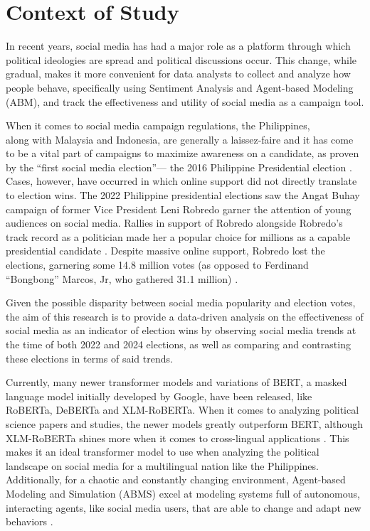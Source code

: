 \section{Context of Study}
In recent years, social media has had a major role as a platform through which political ideologies are spread and political discussions occur. This change, while gradual, makes it more convenient for data analysts to collect and analyze how people behave, specifically using Sentiment Analysis and Agent-based Modeling (ABM), and track the effectiveness and utility of social media as a campaign tool.

When it comes to social media campaign regulations, the Philippines,\\
along with Malaysia and Indonesia, are generally a laissez-faire and it has come to be a vital part of campaigns to maximize awareness on a candidate, as proven by the “first social media election”— the 2016 Philippine Presidential election \cite{Tapsell-2020, Sinpeng-2020}. Cases, however, have occurred in which online support did not directly translate to election wins. The 2022 Philippine presidential elections saw the Angat Buhay campaign of former Vice President Leni Robredo garner the attention of young audiences on social media. Rallies in support of Robredo alongside Robredo’s track record as a politician made her a popular choice for millions as a capable presidential candidate \cite{Johnson-2022}. Despite massive online support, Robredo lost the elections, garnering some 14.8 million votes (as opposed to Ferdinand “Bongbong” Marcos, Jr, who gathered 31.1 million) \cite{ABSCBN-2022}.

Given the possible disparity between social media popularity and election votes, the aim of this research is to provide a data-driven analysis on the effectiveness of social media as an indicator of election wins by observing social media trends at the time of both 2022 and 2024 elections, as well as comparing and contrasting these elections in terms of said trends.

Currently, many newer transformer models and variations of BERT, a masked language model initially developed by Google, have been released, like\\
RoBERTa, DeBERTa and XLM-RoBERTa. When it comes to analyzing political science papers and studies, the newer models greatly outperform BERT, although XLM-RoBERTa shines more when it comes to cross-lingual applications \cite{Timoneda-2025}. This makes it an ideal transformer model to use when analyzing the political landscape on social media for a multilingual nation like the Philippines. Additionally, for a chaotic and constantly changing environment, Agent-based Modeling and Simulation (ABMS) excel at modeling systems full of autonomous, interacting agents, like social media users, that are able to change and adapt new behaviors \cite{Macal-2009}.

